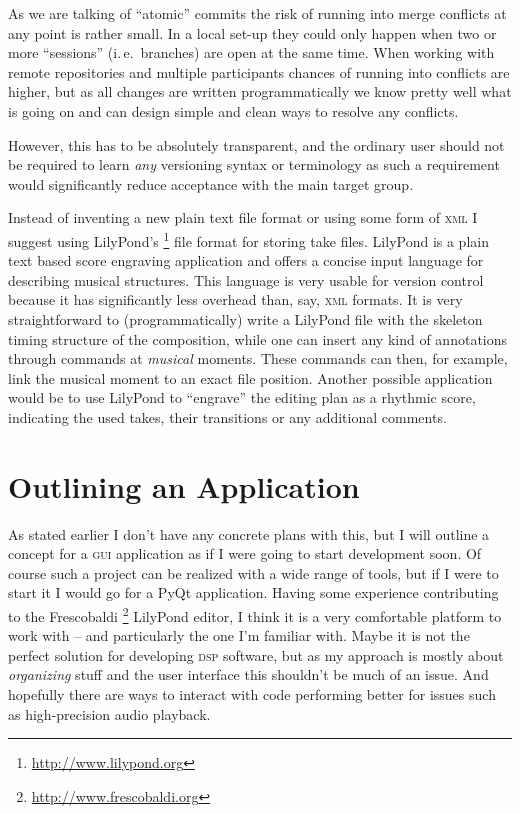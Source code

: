 \documentclass[11pt,a4paper]{article}
\begin{document}
As we are talking of “atomic” commits the risk of running into merge conflicts
at any point is rather small.
In a local set-up they could only happen when two or more “sessions” (i.\,e.\
branches) are open at the same time.
When working with remote repositories and multiple participants chances of
running into conflicts are higher, but as all changes are written
programmatically we know pretty well what is going on and can design simple and
clean ways to resolve any conflicts.

However, this has to be absolutely transparent, and the ordinary user should not
be required to learn \emph{any} versioning syntax or terminology as
such a requirement would significantly reduce acceptance with the main target
group.

\medskip
Instead of inventing a new plain text file format or using some form of
\textsc{xml} I suggest using LilyPond's%
\footnote{\url{http://www.lilypond.org}}
file format for storing take files.
LilyPond is a plain text based score engraving application and offers a
concise input language for describing musical structures.
This language is very usable for version control because it has
significantly less overhead than, say, \textsc{xml} formats.
It is very straightforward to (programmatically) write a LilyPond file with the
skeleton timing structure of the composition, while one can insert any
kind of annotations through commands at \emph{musical} moments.
These commands can then, for example, link the musical moment to an
exact file position.
Another possible application would be to use LilyPond to “engrave” the
editing plan as a rhythmic score, indicating the used takes, their
transitions or any additional comments.

\section{Outlining an Application}

As stated earlier I don't have any concrete plans with this, but I will outline
a concept for a \textsc{gui} application as if I were going to start development
soon.
Of course such a project can be realized with a wide range of tools, but if I
were to start it I would go for a PyQt application.
Having some experience contributing to the Frescobaldi%
\footnote{\url{http://www.frescobaldi.org}}
LilyPond editor, I think it is a very comfortable platform to work with -- and
particularly the one I'm familiar with. Maybe it is not the perfect solution
for developing \textsc{dsp} software, but as my approach is mostly about
\emph{organizing} stuff and the user interface this shouldn't be much of an issue.
And hopefully there are ways to interact with code performing better for issues
such as high-precision audio playback.
\end{document}
